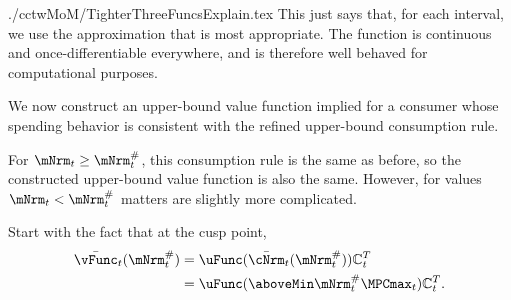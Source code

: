 \documentclass[titlepage, headings=optiontotocandhead]{\econtex}
\begin{document}
\begin{verbatimwrite}{./cctwMoM/TighterThreeFuncsExplain.tex}
  This just says that, for each interval, we use the approximation that
  is most appropriate.  The function is continuous and
  once-differentiable everywhere, and is therefore well behaved for
  computational purposes.

  We now construct an upper-bound value function implied for a consumer whose spending behavior
  is consistent with the refined upper-bound consumption rule.  

  For $\mNrm_{t} \geq \mNrm_{t}^{\#}$, this consumption rule is the same as before,
  so the constructed upper-bound value function is also the same.  However, for 
  values $\mNrm_{t} < \mNrm_{t}^{\#}$ matters are slightly more complicated.  

  Start with the fact that at the cusp point, 
  \begin{equation*}\begin{gathered}\begin{aligned}
        \bar{\vFunc}_{t}(\mtCusp)  & = \uFunc(\bar{\cNrm}_{t}(\mtCusp))\mathbb{C}_{t}^{T} \\
        & =  \uFunc(\aboveMin \mtCusp  \MPCmax_{t})\mathbb{C}_{t}^{T}
        .
      \end{aligned}\end{gathered}\end{equation*}


\end{verbatimwrite}
\end{document}
